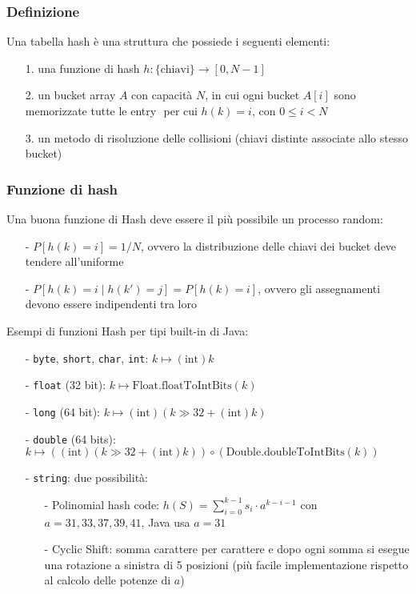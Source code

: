 \documentclass[a4paper]{article}
\begin{document}
\subsubsection*{Definizione}
Una tabella hash è una struttura che possiede i seguenti elementi:
\begin{itemize}[topsep=3pt, itemsep=0pt]
	\item[1.] una funzione di hash \(h : \{\text{chiavi}\} \to [0,N-1]\)
	\item[2.] un bucket array \(A\) con capacità \(N\), in cui ogni bucket \(A[i]\) sono memorizzate tutte le entry \(<k,v>\) per
	cui \(h(k) = i\), con \(0 \leq i < N\)
	\item[3.] un metodo di risoluzione delle collisioni (chiavi distinte associate allo stesso bucket)
\end{itemize}

\subsubsection*{Funzione di hash}
Una buona funzione di Hash deve essere il più possibile un processo random:
\begin{itemize}[topsep=3pt, itemsep=0pt]
	\item[-] \(P[h(k) = i] = 1/N\), ovvero la distribuzione delle chiavi dei bucket deve tendere all'uniforme
	\item[-] \(P[h(k) = i \; | \;  h(k') = j] = P[h(k) = i]\), ovvero gli assegnamenti devono essere indipendenti tra loro
\end{itemize}
Esempi di funzioni Hash per tipi built-in di Java:
\begin{itemize}[topsep=3pt, itemsep=0pt]
	\item[-] \verb|byte|, \verb|short|, \verb|char|, \verb|int|: \(k \mapsto (\text{int})k\)
	\item[-] \verb|float| (32 bit): \(k \mapsto \text{Float.floatToIntBits}(k)\)
	\item[-] \verb|long| (64 bit): \(k \mapsto (\text{int})(k \gg 32 + (\text{int})k)\)
	\item[-] \verb|double| (64 bits): \(k \mapsto ((\text{int})(k \gg 32 + (\text{int})k)) \circ (\text{Double.doubleToIntBits}(k))\)
	\item[-] \verb|string|: due possibilità:
	\begin{itemize}[topsep=0pt, itemsep=0pt]
		\item[-] Polinomial hash code: \(h(S) = \sum_{i=0}^{k-1} s_i \cdot a^{k-i-1}\) con \(a = 31, 33, 37, 39, 41\), Java usa \(a=31\)
		\item[-] Cyclic Shift: somma carattere per carattere e dopo ogni somma si esegue una rotazione a sinistra di 5 posizioni
		(più facile implementazione rispetto al calcolo delle potenze di \(a\))
	\end{itemize}
\end{itemize}
\end{document}
